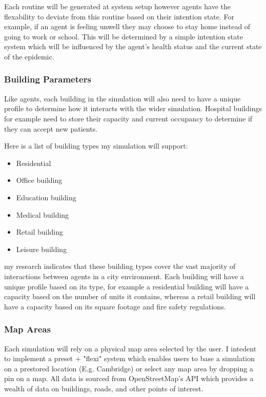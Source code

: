 Each routine will be generated at system setup however agents have the flexability to deviate from this routine based on their intention state. For example, if an agent is feeling unwell they may choose to stay home instead of going to work or school. This will be determined by a simple intention state system which will be influenced by the agent's health status and the current state of the epidemic.

\subsubsection*{Building Parameters}
Like agents, each building in the simulation will also need to have a unique profile to determine how it interacts with the wider simulation. Hospital buildings for example need to store their capacity and current occupancy to determine if they can accept new patients. 

Here is a list of building types my simulation will support:
\begin{itemize}
    \item Residential
    \item Office building
    \item Education building
    \item Medical building
    \item Retail building
    \item Leisure building
\end{itemize}

my research indicates that these building types cover the vast majority of interactions between agents in a city environment. Each building will have a unique profile based on its type, for example a residential building will have a capacity based on the number of units it contains, whereas a retail building will have a capacity based on its square footage and fire safety regulations.

\subsubsection*{Map Areas}
Each simulation will rely on a physical map area selected by the user. I intedent to implement a preset + "flexi" system which enables users to base a simulation on a prestored location (E.g. Cambridge) or select any map area by dropping a pin on a map. All data is sourced from OpenStreetMap's API which provides a wealth of data on buildings, roads, and other points of interest. 


